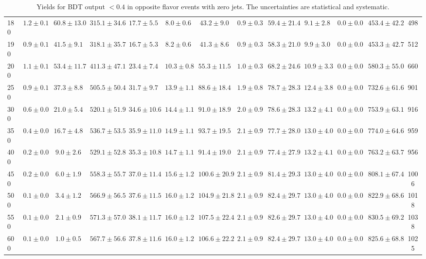 \begin{table}
{\begin{center}
\begin{tabular}{l | c c | c c c c c c c c  | c c}
180 & $1.2\pm0.1$ & $60.8\pm13.0$ & $315.1\pm34.6$ & $17.7\pm5.5$ & $8.0\pm0.6$ & $43.2\pm9.0$ & $0.9\pm0.3$ & $59.4\pm21.4$ & $9.1\pm2.8$ & $0.0\pm0.0$ & $453.4\pm42.2$ & 498 \\
190 & $0.9\pm0.1$ & $41.5\pm9.1$ & $318.1\pm35.7$ & $16.7\pm5.3$ & $8.2\pm0.6$ & $41.3\pm8.6$ & $0.9\pm0.3$ & $58.3\pm21.0$ & $9.9\pm3.0$ & $0.0\pm0.0$ & $453.3\pm42.7$ & 512 \\
200 & $1.1\pm0.1$ & $53.4\pm11.7$ & $411.3\pm47.1$ & $23.4\pm7.4$ & $10.3\pm0.8$ & $55.3\pm11.5$ & $1.0\pm0.3$ & $68.2\pm24.6$ & $10.9\pm3.3$ & $0.0\pm0.0$ & $580.3\pm55.0$ & 660 \\
250 & $0.9\pm0.1$ & $37.3\pm8.8$ & $505.5\pm50.4$ & $31.7\pm9.7$ & $13.9\pm1.1$ & $88.6\pm18.4$ & $1.9\pm0.8$ & $78.7\pm28.3$ & $12.4\pm3.8$ & $0.0\pm0.0$ & $732.6\pm61.6$ & 901 \\
300 & $0.6\pm0.0$ & $21.0\pm5.4$ & $520.1\pm51.9$ & $34.6\pm10.6$ & $14.4\pm1.1$ & $91.0\pm18.9$ & $2.0\pm0.9$ & $78.6\pm28.3$ & $13.2\pm4.1$ & $0.0\pm0.0$ & $753.9\pm63.1$ & 916 \\
350 & $0.4\pm0.0$ & $16.7\pm4.8$ & $536.7\pm53.5$ & $35.9\pm11.0$ & $14.9\pm1.1$ & $93.7\pm19.5$ & $2.1\pm0.9$ & $77.7\pm28.0$ & $13.0\pm4.0$ & $0.0\pm0.0$ & $774.0\pm64.6$ & 959 \\
400 & $0.2\pm0.0$ & $9.0\pm2.6$ & $529.1\pm52.8$ & $35.3\pm10.8$ & $14.7\pm1.1$ & $91.4\pm19.0$ & $2.1\pm0.9$ & $77.4\pm27.9$ & $13.2\pm4.1$ & $0.0\pm0.0$ & $763.2\pm63.7$ & 956 \\
450 & $0.2\pm0.0$ & $6.0\pm1.9$ & $558.3\pm55.7$ & $37.0\pm11.4$ & $15.6\pm1.2$ & $100.6\pm20.9$ & $2.1\pm0.9$ & $81.4\pm29.3$ & $13.0\pm4.0$ & $0.0\pm0.0$ & $808.1\pm67.4$ & 1006 \\
500 & $0.1\pm0.0$ & $3.4\pm1.2$ & $566.9\pm56.5$ & $37.6\pm11.5$ & $16.0\pm1.2$ & $104.9\pm21.8$ & $2.1\pm0.9$ & $82.4\pm29.7$ & $13.0\pm4.0$ & $0.0\pm0.0$ & $822.9\pm68.6$ & 1018 \\
550 & $0.1\pm0.0$ & $2.1\pm0.9$ & $571.3\pm57.0$ & $38.1\pm11.7$ & $16.0\pm1.2$ & $107.5\pm22.4$ & $2.1\pm0.9$ & $82.6\pm29.7$ & $13.0\pm4.0$ & $0.0\pm0.0$ & $830.5\pm69.2$ & 1038 \\
600 & $0.1\pm0.0$ & $1.0\pm0.5$ & $567.7\pm56.6$ & $37.8\pm11.6$ & $16.0\pm1.2$ & $106.6\pm22.2$ & $2.1\pm0.9$ & $82.4\pm29.7$ & $13.0\pm4.0$ & $0.0\pm0.0$ & $825.6\pm68.8$ & 1025 \\
\hline
\end{tabular}
\end{center}
\label{tab:yields_bdtlo_0j}
\caption{Yields for BDT output $<0.4$ in opposite flavor events with zero jets. The uncertainties are statistical and systematic.}}
\end{table}

